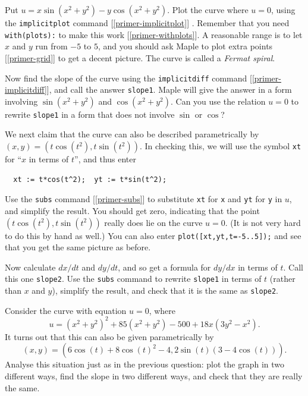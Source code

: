 \documentclass[a4paper,10pt]{amsbook}
\begin{document}
\begin{exercise}\label{ex-fermat-spiral}
 Put $u=x\sin(x^2+y^2)-y\cos(x^2+y^2)$.  Plot the curve
 where $u=0$, using the \verb+implicitplot+ command
 [\ref{primer-implicitplot}] .  Remember that you need
 \verb~with(plots):~ to make this work
 [\ref{primer-withplots}].  A reasonable range is to let $x$
 and $y$ run from $-5$ to $5$, and you should ask Maple to
 plot extra points [\ref{primer-grid}] to get a decent picture.
 The curve is called a \emph{Fermat spiral}.

 Now find the slope of the curve using the
 \verb+implicitdiff+ command [\ref{primer-implicitdiff}], and
 call the answer \verb+slope1+.  Maple will give the answer
 in a form involving $\sin(x^2+y^2)$ and $\cos(x^2+y^2)$.
 Can you use the relation $u=0$ to rewrite \verb+slope1+ in
 a form that does not involve $\sin$ or $\cos$?

 We next claim that the curve can also be described
 parametrically by $(x,y)=(t\cos(t^2),t\sin(t^2))$.  In
 checking this, we will use the symbol \verb~xt~ for ``$x$
 in terms of $t$'', and thus enter
\begin{verbatim}
  xt := t*cos(t^2);  yt := t*sin(t^2);
\end{verbatim}
 Use the \verb~subs~ command [\ref{primer-subs}] to substitute
 \verb~xt~ for \verb~x~ and \verb~yt~ for \verb~y~ in $u$,
 and simplify the result.  You should get zero, indicating
 that the point $(t\cos(t^2),t\sin(t^2))$ really does lie on
 the curve $u=0$.  (It is not very hard to do this by hand
 as well.)  You can also enter \verb~plot([xt,yt,t=-5..5]);~
 and see that you get the same picture as before. 

 Now calculate $dx/dt$ and $dy/dt$, and so get a formula for
 $dy/dx$ in terms of $t$.  Call this one \verb~slope2~.  Use
 the \verb~subs~ command to rewrite \verb~slope1~ in terms
 of $t$ (rather than $x$ and $y$), simplify the result, and
 check that it is the same as \verb~slope2~. 
\end{exercise}

\begin{exercise}\label{ex-trefoil}
 Consider the curve with equation $u=0$, where
 \[ u = (x^2+y^2)^2 + 85(x^2+y^2) - 500 + 18x(3y^2-x^2). \]
 It turns out that this can also be given parametrically by 
 \[ (x,y) =
     (6\cos(t) + 8\cos(t)^2 - 4, 2\sin(t)(3-4\cos(t))). 
 \]
 Analyse this situation just as in the previous question:
 plot the graph in two different ways, find the slope in two
 different ways, and check that they are really the same. 
\end{exercise}
\end{document}
